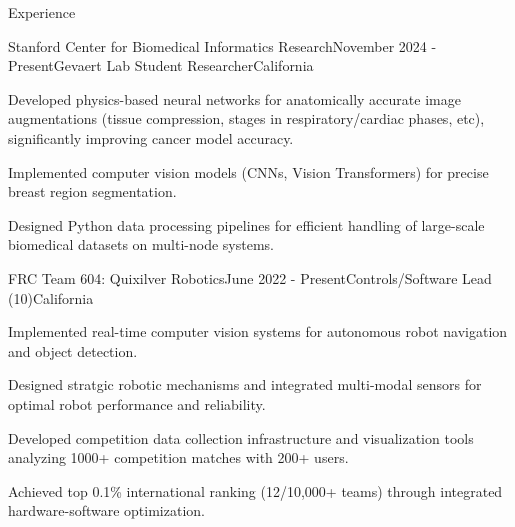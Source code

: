 \documentclass[
  10pt, %
]{resume}
\begin{document}
\sloppy


\begin{rSection}{Experience}


  \begin{rSubsection}{Stanford Center for Biomedical Informatics Research}{November 2024 - Present}{Gevaert Lab Student Researcher}{California}
    
    \item Developed physics-based neural networks for anatomically accurate image augmentations (tissue compression, stages in respiratory/cardiac phases, etc), significantly improving cancer model accuracy.
    
    \item Implemented computer vision models (CNNs, Vision Transformers) for precise breast region segmentation.
    
    \item Designed Python data processing pipelines for efficient handling of large-scale biomedical datasets on multi-node systems.
    
  \end{rSubsection}
        
  \begin{rSubsection}{FRC Team 604: Quixilver Robotics}{June 2022 - Present}{Controls/Software Lead (10)}{California}
    
    \item Implemented real-time computer vision systems for autonomous robot navigation and object detection.
    
    \item Designed stratgic robotic mechanisms and integrated multi-modal sensors for optimal robot performance and reliability.
    
    \item Developed competition data collection infrastructure and visualization tools analyzing 1000+ competition matches with 200+ users.
    
    \item Achieved top 0.1\% international ranking (12/10,000+ teams) through integrated hardware-software optimization.
    
  \end{rSubsection}
        

\end{rSection}
\end{document}

